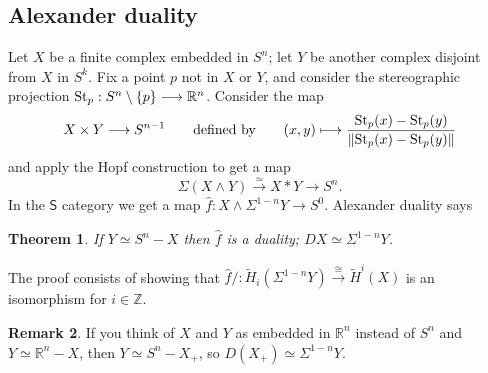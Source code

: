 \documentclass{article}
\newcommand{\Z}{\mathbb{Z}}
\newcommand{\R}{\mathbb{R}}
\newcommand{\sprod}{\wedge}
\newcommand{\CatOf}[1]{\mathsf{#1}}
\newcommand{\pt}[1]{#1_+}
\newcommand{\Suspend}{\Sigma}
\renewcommand{\to}{\longrightarrow}
\renewcommand{\mapsto}{\longmapsto}
\newtheorem{thm}{Theorem}[section]
\theoremstyle{definition}
\newtheorem{rem}[thm]{Remark}
\begin{document}
\subsection*{Alexander duality}
Let $X$ be a finite complex embedded in $S^n$; let $Y$ be another complex disjoint from $X$ in $S^k$. Fix a point $p$ not in $X$ or $Y$, and consider the stereographic projection $\textup{St}_p:S^n\setminus\{p\}\to\R^n$.  Consider the map
\[X \times Y  \to S^{n-1}\text{\qquad defined by\qquad}(x, y)  \mapsto \frac{\textup{St}_p(x)-\textup{St}_p(y)}{\|\textup{St}_p(x)-\textup{St}_p(y)\|}\]
and apply the Hopf construction to get a map
\[\Sigma(X\wedge Y)\overset{\simeq}{\to}X\ast Y\to S^n.\]
In the $\CatOf{S}$ category we get a map $\hat f: X \sprod \Suspend^{1-n} Y \to S^0$.  Alexander duality says
\begin{thm}
If $Y \simeq S^n - X$ then $\hat f$ is a duality; $DX \simeq \Suspend^{1-n} Y$.  
\end{thm}
\noindent The proof consists of showing that $\hat f/: \widetilde H_i (\Suspend^{1-n} Y) \stackrel{\cong}{\to} \widetilde H^i (X)$ is an isomorphism for $i \in \Z$.
\begin{rem}
If you think of $X$ and $Y$ as embedded in $\R^n$ instead of $S^n$ and $Y \simeq \R^n - X$, then $Y \simeq S^n - \pt{X}$, so $D(\pt{X}) \simeq \Suspend^{1-n} Y$.
\end{rem}
\end{document}
